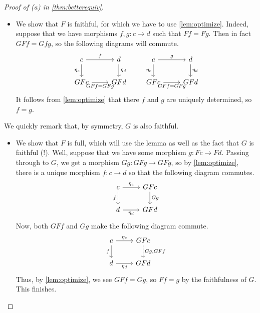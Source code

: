\documentclass[../notes.tex]{subfiles}
\begin{document}
\begin{proof}[Proof of (a) in \autoref{thm:betterequiv}]
\begin{itemize}
		\item We show that $F$ is faithful, for which we have to use \autoref{lem:optimize}. Indeed, suppose that we have morphisms $f,g:c\to d$ such that $Ff=Fg$. Then in fact $GFf=Gfg$, so the following diagrams will commute.
		\[\begin{tikzcd}
			c & d \\
			GFc & GFd
			\arrow["f", from=1-1, to=1-2]
			\arrow["{\eta_c}"', from=1-1, to=2-1]
			\arrow["{\eta_d}", from=1-2, to=2-2]
			\arrow["{GFf=GFg}"', from=2-1, to=2-2]
		\end{tikzcd}\qquad
		\begin{tikzcd}
			c & d \\
			GFc & GFd
			\arrow["g", from=1-1, to=1-2]
			\arrow["{\eta_c}"', from=1-1, to=2-1]
			\arrow["{\eta_d}", from=1-2, to=2-2]
			\arrow["{GFf=GFg}"', from=2-1, to=2-2]
		\end{tikzcd}\]
		It follows from \autoref{lem:optimize} that there $f$ and $g$ are uniquely determined, so $f=g$.
	\end{itemize}
	We quickly remark that, by symmetry, $G$ is also faithful.
	\begin{itemize}
		\item We show that $F$ is full, which will use the lemma as well as the fact that $G$ is faithful (!). Well, suppose that we have some morphism $g:Fc\to Fd$. Passing through to $G$, we get a morphism $Gg:GFg\to GFg$, so by \autoref{lem:optimize}, there is a unique morphism $f:c\to d$ so that the following diagram commutes.
		\[\begin{tikzcd}
			c & GFc \\
			d & GFd
			\arrow["f"', dashed, from=1-1, to=2-1]
			\arrow["Gg", from=1-2, to=2-2]
			\arrow["{\eta_c}", from=1-1, to=1-2]
			\arrow["{\eta_d}"', from=2-1, to=2-2]
		\end{tikzcd}\]
		Now, both $GFf$ and $Gg$ make the following diagram commute.
		\[\begin{tikzcd}
			c & GFc \\
			d & GFd
			\arrow["f"', from=1-1, to=2-1]
			\arrow["{Gg,GFf}", dashed, from=1-2, to=2-2]
			\arrow["{\eta_c}", from=1-1, to=1-2]
			\arrow["{\eta_d}"', from=2-1, to=2-2]
		\end{tikzcd}\]
		Thus, by \autoref{lem:optimize}, we see $GFf=Gg$, so $Ff=g$ by the faithfulness of $G$. This finishes.
		\qedhere
	\end{itemize}
\end{proof}
\end{document}
